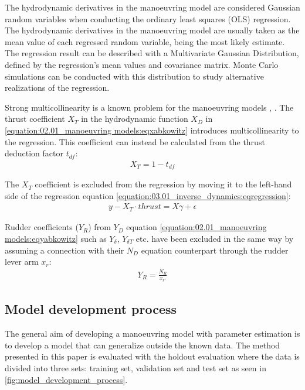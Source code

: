 \noindent The hydrodynamic derivatives in the manoeuvring model are considered Gaussian random variables when conducting the ordinary least squares (OLS) regression. The hydrodynamic derivatives in the manoeuvring model are usually taken as the mean value of each regressed random variable, being the most likely estimate. The regression result can be described with a Multivariate Gaussian Distribution, defined by the regression’s mean values and covariance matrix. Monte Carlo simulations can be conducted with this distribution to study alternative realizations of the regression.


Strong multicollinearity is a known problem for the manoeuvring models \cite{luo_parameter_2016}, \cite{wang_quantifying_2018}.
The thrust coefficient \(X_T\) in the hydrodynamic function \(X_D\) in \autoref{equation:02.01_manoeuvring models:eqxabkowitz} introduces multicollinearity to the regression. This coefficient can instead be calculated from the thrust deduction factor \(t_{df}\):
\begin{equation}\label{equation:03.01_inverse_dynamics:eqXthrust}
\begin{split}\displaystyle X_{T} = 1 - t_{df}\end{split}
\end{equation}

\noindent The \(X_T\) coefficient is excluded from the regression by moving it to the left-hand side of the regression equation \autoref{equation:03.01_inverse_dynamics:eqregression}:
\begin{equation}\label{equation:03.01_inverse_dynamics:eqexclude}
\begin{split}y-X_T \cdot thrust = X \gamma + \epsilon\end{split}
\end{equation}

\noindent Rudder coefficients (\(Y_R\)) from \(Y_D\) equation \autoref{equation:02.01_manoeuvring models:eqyabkowitz} such as \(Y_{\delta}\), \(Y_{\delta T}\) etc. have been excluded in the same way by assuming a connection with their \(N_D\) equation counterpart through the rudder lever arm \(x_r\):
\begin{equation}\label{equation:03.01_inverse_dynamics:eqyr}
\begin{split}\displaystyle Y_{R} = \frac{N_{R}}{x_{r'}}\end{split}
\end{equation}

\subsection{Model development process}
\label{sec:model_development_process}
The general aim of developing a manoeuvring model with parameter estimation is to develop a model that can generalize outside the known data. The method presented in this paper is evaluated with the holdout evaluation \cite{sammut_holdout_2017} where the data is divided into three sets: training set, validation set and test set as seen in \autoref{fig:model_development_process}.

